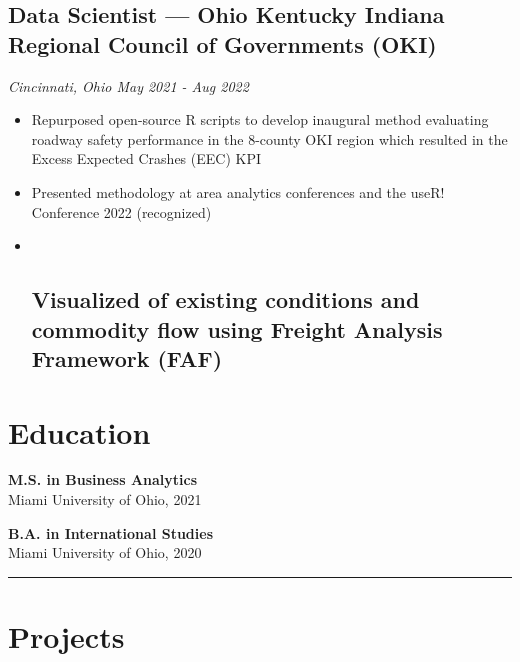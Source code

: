 \documentclass[
  11pt,
]{article}
\begin{document}
\hypertarget{data-scientist-ohio-kentucky-indiana-regional-council-of-governments-oki}{%
\subsection{Data Scientist --- Ohio Kentucky Indiana Regional Council of
Governments
(OKI)}\label{data-scientist-ohio-kentucky-indiana-regional-council-of-governments-oki}}

\emph{Cincinnati, Ohio \textbar{} May 2021 - Aug 2022}

\begin{itemize}
\item
  Repurposed open-source R scripts to develop inaugural method
  evaluating roadway safety performance in the 8-county OKI region which
  resulted in the Excess Expected Crashes (EEC) KPI
\item
  Presented methodology at area analytics conferences and the useR!
  Conference 2022 (recognized)
\item ~
  \hypertarget{visualized-of-existing-conditions-and-commodity-flow-using-freight-analysis-framework-faf}{%
  \subsection{Visualized of existing conditions and commodity flow using
  Freight Analysis Framework
  (FAF)}\label{visualized-of-existing-conditions-and-commodity-flow-using-freight-analysis-framework-faf}}
\end{itemize}

\hypertarget{education}{%
\section{Education}\label{education}}

\textbf{M.S. in Business Analytics}\\
Miami University of Ohio, 2021

\textbf{B.A. in International Studies}\\
Miami University of Ohio, 2020

\begin{center}\rule{0.5\linewidth}{0.5pt}\end{center}

\hypertarget{projects}{%
\section{Projects}\label{projects}}
\end{document}
